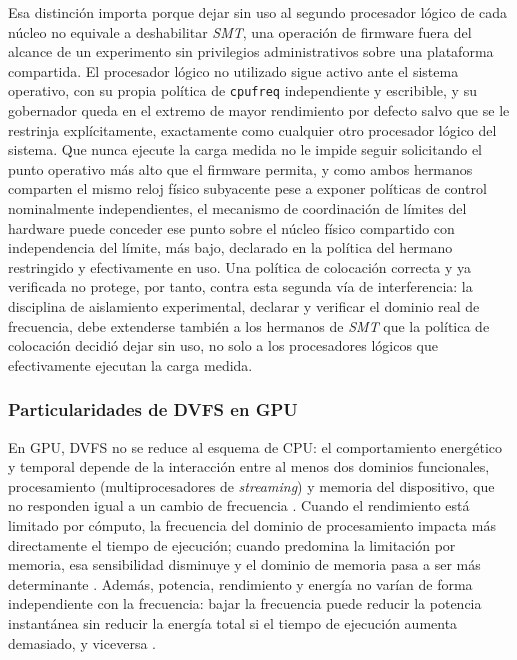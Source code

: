 \documentclass[12pt,oneside,spanish]{book}
\begin{document}
Esa distinción importa porque dejar sin uso al segundo procesador lógico de cada núcleo no equivale a deshabilitar \textit{SMT}, una operación de firmware fuera del alcance de un experimento sin privilegios administrativos sobre una plataforma compartida. El procesador lógico no utilizado sigue activo ante el sistema operativo, con su propia política de \texttt{cpufreq} independiente y escribible, y su gobernador queda en el extremo de mayor rendimiento por defecto salvo que se le restrinja explícitamente, exactamente como cualquier otro procesador lógico del sistema. Que nunca ejecute la carga medida no le impide seguir solicitando el punto operativo más alto que el firmware permita, y como ambos hermanos comparten el mismo reloj físico subyacente pese a exponer políticas de control nominalmente independientes, el mecanismo de coordinación de límites del hardware puede conceder ese punto sobre el núcleo físico compartido con independencia del límite, más bajo, declarado en la política del hermano restringido y efectivamente en uso. Una política de colocación correcta y ya verificada no protege, por tanto, contra esta segunda vía de interferencia: la disciplina de aislamiento experimental, declarar y verificar el dominio real de frecuencia, debe extenderse también a los hermanos de \textit{SMT} que la política de colocación decidió dejar sin uso, no solo a los procesadores lógicos que efectivamente ejecutan la carga medida.

\subsubsection{Particularidades de DVFS en GPU}

En GPU, DVFS no se reduce al esquema de CPU: el comportamiento energético y temporal depende de la interacción entre al menos dos dominios funcionales, procesamiento (multiprocesadores de \textit{streaming}) y memoria del dispositivo, que no responden igual a un cambio de frecuencia \cite{Guerreiro2019}. Cuando el rendimiento está limitado por cómputo, la frecuencia del dominio de procesamiento impacta más directamente el tiempo de ejecución; cuando predomina la limitación por memoria, esa sensibilidad disminuye y el dominio de memoria pasa a ser más determinante \cite{Guerreiro2019,Ali2023}. Además, potencia, rendimiento y energía no varían de forma independiente con la frecuencia: bajar la frecuencia puede reducir la potencia instantánea sin reducir la energía total si el tiempo de ejecución aumenta demasiado, y viceversa \cite{Guerreiro2019,Ali2023}.
\end{document}
